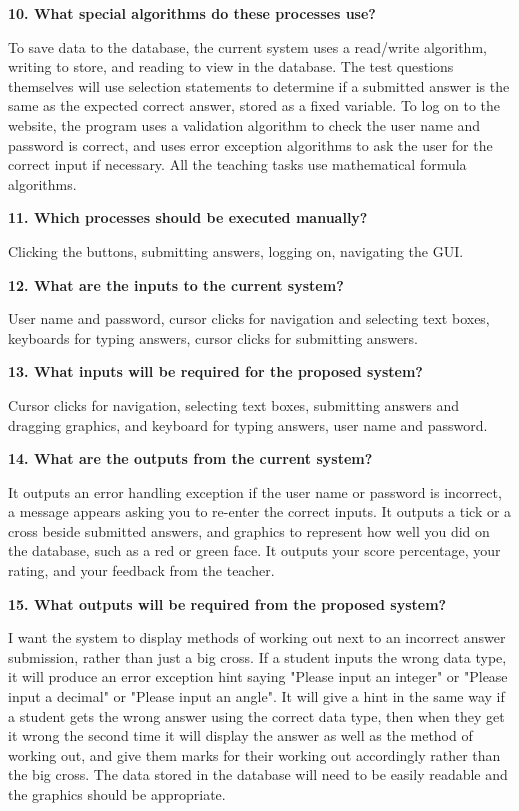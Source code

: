 \textbf{10. What special algorithms do these processes use?}

To save data to the database, the current system uses a read/write algorithm, writing to store, and reading to view in the database. The test questions themselves will use selection statements to determine if a submitted answer is the same as the expected correct answer, stored as a fixed variable. To log on to the website, the program uses a validation algorithm to check the user name and password is correct, and uses error exception algorithms to ask the user for the correct input if necessary. All the teaching tasks use mathematical formula algorithms.

\textbf{11. Which processes should be executed manually?}

Clicking the buttons, submitting answers, logging on, navigating the GUI.

\textbf{12. What are the inputs to the current system?}

User name and password, cursor clicks for navigation and selecting text boxes, keyboards for typing answers, cursor clicks for submitting answers.

\textbf{13. What inputs will be required for the proposed system?}

Cursor clicks for navigation, selecting text boxes, submitting answers and dragging graphics, and keyboard for typing answers, user name and password.

\textbf{14. What are the outputs from the current system?}

It outputs an error handling exception if the user name or password is incorrect, a message appears asking you to re-enter the correct inputs. It outputs a tick or a cross beside submitted answers, and graphics to represent how well you did on the database, such as a red or green face. It outputs your score percentage, your rating, and your feedback from the teacher. 

\textbf{15. What outputs will be required from the proposed system?}

I want the system to display methods of working out next to an incorrect answer submission, rather than just a big cross. If a student inputs the wrong data type, it will produce an error exception hint saying "Please input an integer" or "Please input a decimal" or "Please input an angle". It will give a hint in the same way if a student gets the wrong answer using the correct data type, then when they get it wrong the second time it will display the answer as well as the method of working out, and give them marks for their working out accordingly rather than the big cross. The data stored in the database will need to be easily readable and the graphics should be appropriate.

